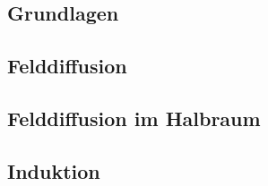 \subsection{Grundlagen}

\subsection{Felddiffusion}

\subsection{Felddiffusion im Halbraum}

\subsection{Induktion}



